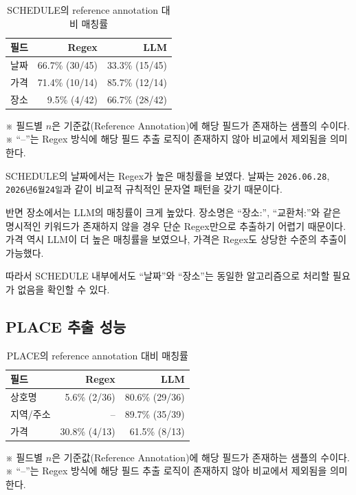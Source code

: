 \documentclass[11pt,a4paper]{article}
\begin{document}
\begin{table}[H]
\centering
\small
\begin{tabularx}{0.92\linewidth}{l r r}
\toprule
\textbf{필드} & \textbf{Regex} & \textbf{LLM}\\
\midrule
날짜 & 66.7\% (30/45) & 33.3\% (15/45)\\
가격 & 71.4\% (10/14) & 85.7\% (12/14)\\
장소 & 9.5\% (4/42) & 66.7\% (28/42)\\
\bottomrule
\end{tabularx}
\caption{SCHEDULE의 reference annotation 대비 매칭률}
\end{table}
\vspace{-0.3em}
\begin{flushleft}
\footnotesize ※ 필드별 $n$은 기준값(Reference Annotation)에 해당 필드가 존재하는 샘플의 수이다. ※ ``--''는 Regex 방식에 해당 필드 추출 로직이 존재하지 않아 비교에서 제외됨을 의미한다.
\end{flushleft}


SCHEDULE의 날짜에서는 Regex가 높은 매칭률을 보였다. 날짜는 \texttt{2026.06.28}, \texttt{2026년6월24일}과 같이 비교적 규칙적인 문자열 패턴을 갖기 때문이다.

반면 장소에서는 LLM의 매칭률이 크게 높았다. 장소명은 ``장소:'', ``교환처:''와 같은 명시적인 키워드가 존재하지 않을 경우 단순 Regex만으로 추출하기 어렵기 때문이다. 가격 역시 LLM이 더 높은 매칭률을 보였으나, 가격은 Regex도 상당한 수준의 추출이 가능했다.

따라서 SCHEDULE 내부에서도 ``날짜''와 ``장소''는 동일한 알고리즘으로 처리할 필요가 없음을 확인할 수 있다.

\subsection{PLACE 추출 성능}

\begin{table}[H]
\centering
\small
\begin{tabularx}{0.92\linewidth}{l r r}
\toprule
\textbf{필드} & \textbf{Regex} & \textbf{LLM}\\
\midrule
상호명 & 5.6\% (2/36) & 80.6\% (29/36)\\
지역/주소 & -- & 89.7\% (35/39)\\
가격 & 30.8\% (4/13) & 61.5\% (8/13)\\
\bottomrule
\end{tabularx}
\caption{PLACE의 reference annotation 대비 매칭률}
\end{table}
\vspace{-0.3em}
\begin{flushleft}
\footnotesize ※ 필드별 $n$은 기준값(Reference Annotation)에 해당 필드가 존재하는 샘플의 수이다. ※ ``--''는 Regex 방식에 해당 필드 추출 로직이 존재하지 않아 비교에서 제외됨을 의미한다.
\end{flushleft}
\end{document}

